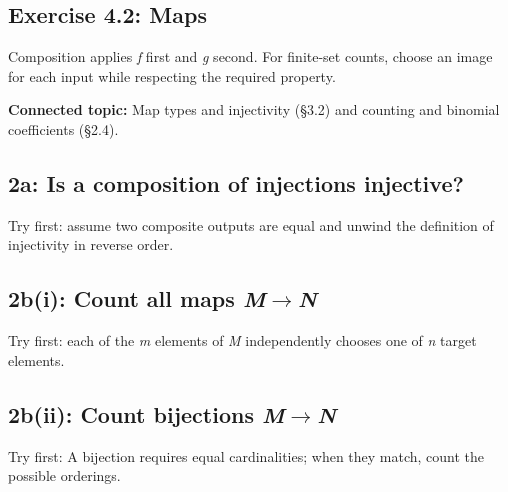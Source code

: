 \documentclass[11pt]{article}
\begin{document}
\begin{keepsection}
\section{Exercise 4.2: Maps}

Composition applies \textit{f} first and \textit{g} second. For finite-set counts, choose an image for each input while respecting the required property.

\textbf{Connected topic:} Map types and injectivity (§3.2) and counting and binomial coefficients (§2.4).

\begin{keepsection}
\subsection{2a: Is a composition of injections injective?}

Try first: assume two composite outputs are equal and unwind the definition of injectivity in reverse order.

\end{keepsection}

\begin{keepsection}
\subsection{2b(i): Count all maps \textit{M}\ensuremath{\to}\textit{N}}

Try first: each of the \textit{m} elements of \textit{M} independently chooses one of \textit{n} target elements.

\end{keepsection}

\begin{keepsection}
\subsection{2b(ii): Count bijections \textit{M}\ensuremath{\to}\textit{N}}

Try first: A bijection requires equal cardinalities; when they match, count the possible orderings.


\end{keepsection}
\end{keepsection}
\end{document}
